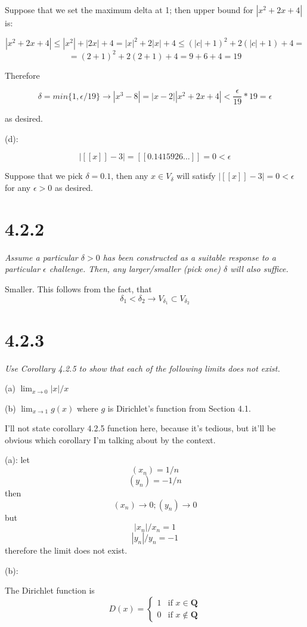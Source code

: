 \documentclass[11pt,oneside,titlepage]{article}
\begin{document}
Suppose that we set the maximum delta at 1; then upper bound for $|x^2 + 2x + 4|$ is:

$$ |x^2 + 2x + 4| \leq |x^2| + |2x| + 4 = |x|^2 + 2|x| + 4 \leq (|c| + 1)^2 + 2(|c| + 1) + 4 =$$
$$= (2 + 1)^2 + 2(2 + 1) + 4 = 9 + 6 + 4 = 19
$$

Therefore

$$\delta = min\{1, \epsilon/19\} \to |x^3 - 8| = |x-2||x^2 + 2x + 4| < \frac{\epsilon}{19} * 19 = \epsilon $$

as desired.

(d):

$$ |[[x]] - 3| = [[0.1415926...]] = 0 < \epsilon $$

Suppose that we pick $\delta = 0.1$, then any $x \in V_{\delta}$ will satisfy $|[[x]] - 3| = 0 < \epsilon $
for any $\epsilon > 0$ as desired.

\section*{4.2.2}
\textit{Assume a particular $\delta > 0$ has been constructed as a suitable response
  to a particular $\epsilon$ challenge. Then, any larger/smaller (pick one) $\delta$ will also suffice.}

Smaller. This follows from the fact, that
$$\delta_1 < \delta_2 \to V_{\delta_1} \subset V_{\delta_2}$$

\section*{4.2.3}
\textit{Use Corollary 4.2.5 to show that each of the following limits does not exist.}

(a) $\lim_{x\to0} |x|/x$

(b) $\lim_{x\to 1} g(x)$ where $g$ is Dirichlet’s function from Section 4.1.

I'll not state corollary 4.2.5  function here, because it's tedious, but it'll be obvious which corollary I'm talking about by the context.


(a): let
$$(x_n) = 1/n$$
$$(y_n) = -1/n$$
then
$$(x_n) \to 0;(y_n) \to 0$$
but
$$|x_n| / x_n = 1$$
$$|y_n| / y_n = -1$$
therefore the limit does not exist.

(b):

The Dirichlet function is
\begin{equation}
D(x)=
    \begin{cases}
        1 & \text{if } x \in \textbf{Q}\\
        0 & \text{if } x \notin \textbf{Q}
    \end{cases}
\end{equation}
\end{document}
